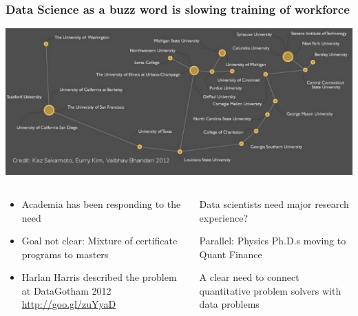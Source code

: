 \begin{frame}
\frametitle{Data Science as a buzz word is slowing training of workforce}

\begin{center}
\includegraphics[width=1.0\textwidth]{graphics/courseconstellation.pdf}

\begin{columns}

\begin{column}{0.5\textwidth}
\begin{center}
\begin{itemize}
    \tiny\item \tiny{Academia has been responding to the need}
    \item \tiny{Goal not clear: Mixture of certificate programs to masters} 
    \item \tiny{Harlan Harris described the problem at DataGotham 2012 \url{http://goo.gl/zuYyaD}}
\end{itemize}
\end{center}
\end{column}

\begin{column}{0.5\textwidth}
\begin{itemize}
    \tiny{\item Data scientists need major research experience?}
    \tiny{\item Parallel: Physics Ph.D.s moving to Quant Finance}
    \tiny{\item A clear need to connect quantitative problem solvers with data problems}
\end{itemize}
\end{column}

\end{columns}

\end{center}

\end{frame}

